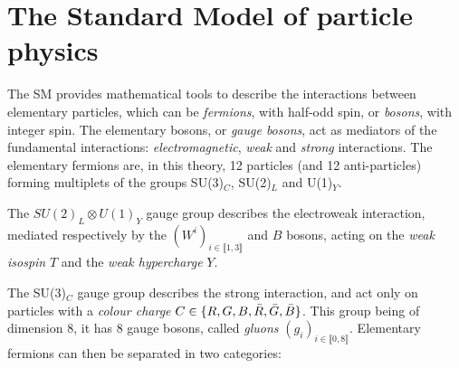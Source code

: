 \section{The Standard Model of particle physics} \label{sec:SM}

The \gls{SM} provides mathematical tools to describe the interactions between elementary particles, which can be \textit{fermions}, with half-odd spin, or \textit{bosons}, with integer spin.
The elementary bosons, or \textit{gauge bosons}, act as mediators of the fundamental interactions: \textit{electromagnetic}, \textit{weak} and \textit{strong} interactions.
The elementary fermions are, in this theory, 12 particles (and 12 anti-particles) forming multiplets of the groups SU(3)$_C$, SU(2)$_L$ and U(1)$_Y$.

The $SU(2)_L \otimes U(1)_Y$ gauge group describes the electroweak interaction, mediated respectively by the $\left(W^i\right)_{i\in\llbracket1,3\rrbracket}$ and $B$ bosons, acting on the \textit{weak isospin} $T$ and the \textit{weak hypercharge} $Y$.

The SU(3)$_C$ gauge group describes the strong interaction, and act only on particles with a \textit{colour charge} $C\in\{R,G,B,\Bar{R},\Bar{G},\Bar{B}\}$. This group being of dimension 8, it has 8 gauge bosons, called \textit{gluons} $\left(g_i\right)_{i\in\llbracket0,8\rrbracket}$.
Elementary fermions can then be separated in two categories:

